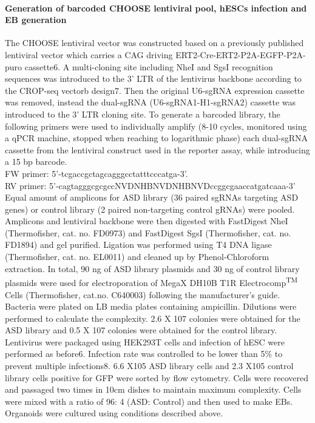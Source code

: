 \paragraph{Generation of barcoded CHOOSE lentiviral pool, hESCs infection and EB generation}
The CHOOSE lentiviral vector was constructed based on a previously published lentiviral vector which carries a CAG driving ERT2-Cre-ERT2-P2A-EGFP-P2A-puro cassette6. A multi-cloning site including NheI and SgsI recognition sequences was introduced to the 3' LTR of the lentivirus backbone according to the CROP-seq vectorb design7. Then the original U6-sgRNA expression cassette was removed, instead the dual-sgRNA (U6-sgRNA1-H1-sgRNA2) cassette was introduced to the 3' LTR cloning site. To generate a barcoded library, the following primers were used to individually amplify (8-10 cycles, monitored using a qPCR machine, stopped when reaching to logarithmic phase) each dual-sgRNA cassette from the lentiviral construct used in the reporter assay,  while introducing a 15 bp barcode. \\
FW primer: 5'-tcgaccgctagcagggcctatttcccatga-3'. \\
RV primer: 5'-cagtagggcgcgccNVDNHBNVDNHBNVDccggcgaaccatgatcaaa-3' \\
Equal amount of amplicons for ASD library (36 paired sgRNAs targeting ASD genes) or control library (2 paired non-targeting control gRNAs) were pooled. Amplicons and lentiviral backbone were then digested with FastDigest NheI (Thermofisher, cat. no. FD0973) and FastDigest SgsI (Thermofisher, cat. no. FD1894) and gel purified. Ligation was performed using T4 DNA ligase (Thermofisher, cat. no. EL0011) and cleaned up by Phenol-Chloroform extraction. In total, 90 ng of ASD library plasmids and 30 ng of control library plasmids were used for electroporation of MegaX DH10B T1R Electrocomp\textsuperscript{TM} Cells (Thermofisher, cat.no. C640003) following the manufacturer's guide. Bacteria were plated on LB media plates containing ampicillin. Dilutions were performed to calculate the complexity. 2.6 X 107 colonies were obtained for the ASD library and 0.5 X 107 colonies were obtained for the control library. Lentivirus were packaged using HEK293T cells and infection of hESC were performed as before6.  Infection rate was controlled to be lower than 5\% to prevent multiple infections8. 6.6 X105 ASD library cells and 2.3 X105 control library cells positive for GFP were sorted by flow cytometry. Cells were recovered and passaged two times in 10cm dishes to maintain maximum complexity. Cells were mixed with a ratio of 96: 4 (ASD: Control) and then used to make EBs. Organoids were cultured using conditions described above. 

